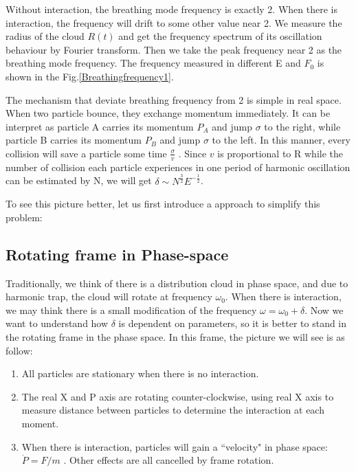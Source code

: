 \documentclass[aps,pre,twocolumn
,groupedaddress]{revtex4-1}
\begin{document}
Without interaction, the breathing mode frequency is exactly 2. When there is interaction, the frequency will drift to some other value near 2. We measure the radius of the cloud $R(t)$ and get the frequency spectrum of its oscillation behaviour by Fourier transform. Then we take the peak frequency near 2 as the breathing mode frequency. The frequency measured in different E and $F_0$ is shown in the Fig.\ref{Breathingfrequency1}.

The mechanism that deviate breathing frequency from 2 is simple in real space. When two particle bounce, they exchange momentum immediately. It can be interpret as particle A carries its momentum $P_A$ and jump $\sigma$ to the right, while particle B carries its momentum $P_B$ and jump $\sigma$ to the left. In this manner, every collision will save a particle some time $\frac{\sigma}{v}$ . Since $v$ is proportional to R while the number of collision each particle experiences in one period of harmonic oscillation can be estimated by N, we will get $\delta\sim N^{\frac{3}{2}}E^{-\frac{1}{2}}$. 

To see this picture better, let us first introduce a approach to simplify this problem:

\subsection{Rotating frame in Phase-space}
Traditionally, we think of there is a distribution cloud in phase space, and due to harmonic trap, the cloud will rotate at frequency $\omega_0$. When there is interaction, we may think there is a small modification of the frequency $\omega=\omega_0+\delta$. Now we want to understand how $\delta$ is dependent on parameters, so it is better to stand in the rotating frame in the phase space. In this frame, the picture we will see is as follow:\\
\begin{enumerate}[\textbf{*}]
\item All particles are stationary when there is no interaction.
\item The real X and P axis are rotating counter-clockwise, using real X axis to measure distance between particles to determine the interaction at each moment.
\item When there is interaction, particles will gain a ``velocity" in phase space: $\dot{P}=F/m$ . Other effects are all cancelled by frame rotation.
\end{enumerate}
\end{document}
